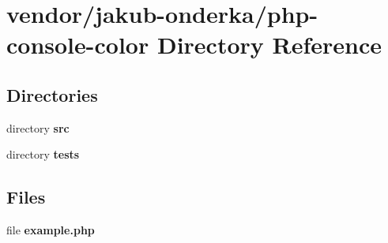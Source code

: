 \section{vendor/jakub-\/onderka/php-\/console-\/color Directory Reference}
\label{dir_592e3b83e1fd5bdb21bd6648f121400d}
\subsection*{Directories}
\begin{DoxyCompactItemize}
\item 
directory {\bf src}
\item 
directory {\bf tests}
\end{DoxyCompactItemize}
\subsection*{Files}
\begin{DoxyCompactItemize}
\item 
file {\bf example.\+php}
\end{DoxyCompactItemize}
